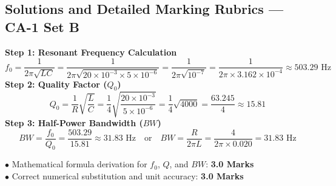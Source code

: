 \newpage
\subsection*{Solutions and Detailed Marking Rubrics --- CA-1 Set B}

\begin{solutionbox}
\textbf{Step 1: Resonant Frequency Calculation}\\
\[ f_0 = \frac{1}{2\pi\sqrt{LC}} = \frac{1}{2\pi\sqrt{20 \times 10^{-3} \times 5 \times 10^{-6}}} = \frac{1}{2\pi\sqrt{10^{-7}}} = \frac{1}{2\pi \times 3.162 \times 10^{-4}} \approx 503.29\text{ Hz} \]
\textbf{Step 2: Quality Factor ($Q_0$)}\\
\[ Q_0 = \frac{1}{R}\sqrt{\frac{L}{C}} = \frac{1}{4}\sqrt{\frac{20 \times 10^{-3}}{5 \times 10^{-6}}} = \frac{1}{4}\sqrt{4000} = \frac{63.245}{4} \approx 15.81 \]
\textbf{Step 3: Half-Power Bandwidth ($BW$)}\\
\[ BW = \frac{f_0}{Q_0} = \frac{503.29}{15.81} \approx 31.83\text{ Hz} \quad \text{or} \quad BW = \frac{R}{2\pi L} = \frac{4}{2\pi \times 0.020} = 31.83\text{ Hz} \]
\begin{markingrubric}
$\bullet$ Mathematical formula derivation for $f_0$, $Q$, and $BW$: \textbf{3.0 Marks}\\
$\bullet$ Correct numerical substitution and unit accuracy: \textbf{3.0 Marks}
\end{markingrubric}
\end{solutionbox}
\newpage
